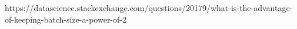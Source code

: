 https://datascience.stackexchange.com/questions/20179/what-is-the-advantage-of-keeping-batch-size-a-power-of-2

